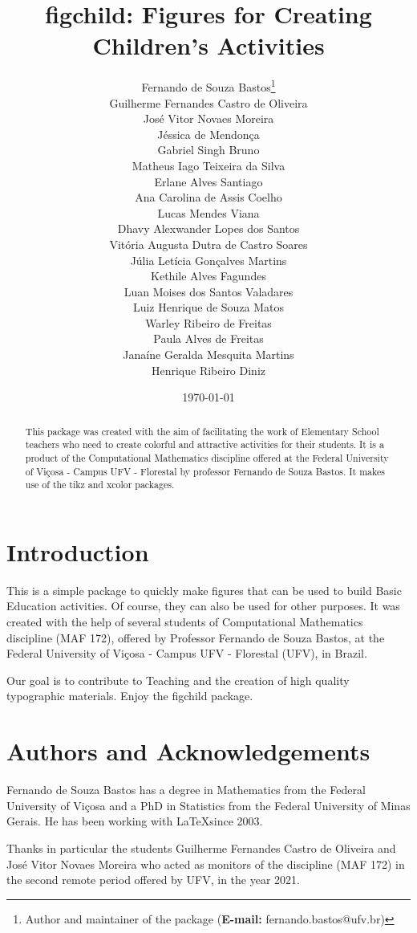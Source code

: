\documentclass{article}
\title{\textbf{figchild:} Figures for Creating Children's Activities}
\author{Fernando de Souza Bastos\footnote{Author and maintainer of the package (\textbf{E-mail:} fernando.bastos@ufv.br)}\\
 Guilherme Fernandes Castro de Oliveira\\
 José Vitor Novaes Moreira\\
 Jéssica de Mendonça\\
 Gabriel Singh Bruno\\
 Matheus Iago Teixeira da Silva\\
 Erlane Alves Santiago\\
 Ana Carolina de Assis Coelho\\
 Lucas Mendes Viana\\
 Dhavy Alexwander Lopes dos Santos\\
 Vitória Augusta Dutra de Castro Soares\\
 Júlia Letícia Gonçalves Martins\\
 Kethile Alves Fagundes\\
 Luan Moises dos Santos Valadares\\
 Luiz Henrique de Souza Matos\\
 Warley Ribeiro de Freitas\\
 Paula Alves de Freitas\\
 Janaíne Geralda Mesquita Martins\\
 Henrique Ribeiro Diniz
}
\date{\today}
\begin{document}
\maketitle

\begin{abstract}
This package was created with the aim of facilitating the work of Elementary School teachers who need to create colorful and attractive activities for their students. It is a product of the Computational Mathematics discipline offered at the Federal University of Viçosa - Campus UFV - Florestal by professor Fernando de Souza Bastos. It makes use of the tikz and xcolor packages.
\end{abstract}

\tableofcontents

\newpage

\listoftables

\section{Introduction}

\hspace{\parindent}This is a simple package to quickly make figures that can be used to build Basic Education activities. Of course, they can also be used for other purposes. It was created with the help of several students of Computational Mathematics discipline (MAF 172), offered by Professor Fernando de Souza Bastos, at the Federal University of Viçosa - Campus UFV - Florestal (UFV), in Brazil.

Our goal is to contribute to Teaching and the creation of high quality typographic materials. Enjoy the figchild package.


\section{Authors and Acknowledgements}

\hspace{\parindent}Fernando de Souza Bastos has a degree in Mathematics from the Federal University of Viçosa and a PhD in Statistics from the Federal University of Minas Gerais. He has been working with \LaTeX since 2003.

Thanks in particular the students Guilherme Fernandes Castro de Oliveira and José Vitor Novaes Moreira who acted as monitors of the discipline (MAF 172) in the second remote period offered by UFV, in the year 2021.

\end{document}
